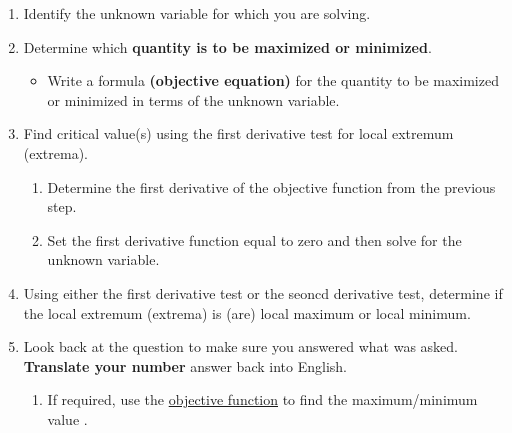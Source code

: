 \begin{tcolorbox}[title={Solving \textbf{Unconstrained} Optimization Problems: Problem-Solving Strategy}]
\begin{enumerate}[leftmargin=*]
\item Identify the unknown variable for which you are solving.  
\item Determine which \textbf{quantity is to be maximized or minimized}.
    \begin{itemize}
        \item Write a formula \textbf{(objective equation)} for the quantity to be maximized or minimized in terms of the unknown variable. 
    \end{itemize}
\item Find critical value(s) using the first derivative test for local extremum (extrema).
    \renewcommand{\labelenumii}{(\roman{enumii})}
    \begin{enumerate}
        \item Determine the first derivative of the objective function from the previous step. 
        \item Set the first derivative function equal to zero and then solve for the unknown variable.
    \end{enumerate}
    \renewcommand{\labelenumi}{\arabic{enumi}}
\item Using either the first derivative test or the seoncd derivative test, determine if the local extremum (extrema) is (are) local maximum or local minimum. 
\item Look back at the question to make sure you answered what was asked. \textbf{Translate your number} answer back into English.
\renewcommand{\labelenumi}{(\alph{enumi})}
    \begin{enumerate}
        \item If required, use the \underline{objective function} to find the maximum/minimum value . 
    \end{enumerate}
\end{enumerate}
\end{tcolorbox}
